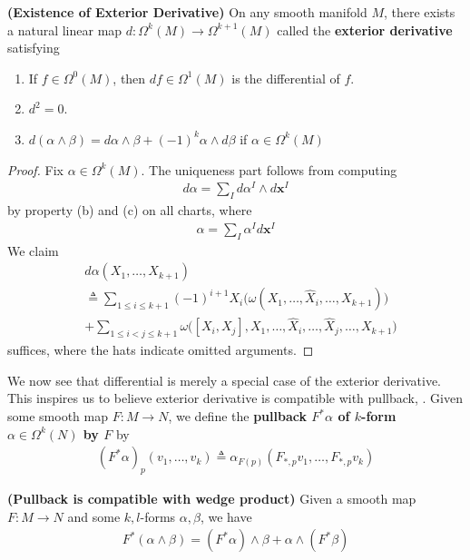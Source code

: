 \documentclass{report}
\begin{document}
\begin{theorem}
\label{Existence of Exterior Derivative}
\textbf{(Existence of Exterior Derivative)} On any smooth manifold $M$, there exists a natural linear map  $d:\Omega^k(M)\rightarrow \Omega^{k+1}(M)$ called the \textbf{exterior derivative} satisfying 
\begin{enumerate}[label=(\alph*)]
  \item If $f \in \Omega^0(M)$, then $df\in \Omega^1(M)$ is the differential of $f$. 
  \item $d^2=0$.
  \item  $d (\alpha \wedge  \beta  )=d\alpha \wedge  \beta +(-1)^k \alpha \wedge  d\beta   $ if $ \alpha  \in \Omega^k(M)$
\end{enumerate}
\end{theorem}
\begin{proof}
  Fix $\alpha  \in \Omega^k(M)$. The uniqueness part follows from computing 
  \begin{align*}
  d\alpha =\sum_I d\alpha^I \wedge  d\textbf{x}^I 
  \end{align*}
by property (b) and (c) on all charts, where 
\begin{align*}
\alpha = \sum_I \alpha^I d\textbf{x}^I
\end{align*}
We claim 
\begin{align*}
&d\alpha (X_1,\dots ,X_{k+1})\\
&\triangleq \sum_{1\leq i\leq k+1}(-1)^{i+1}X_i \Big(\omega (X_1,\dots ,\widehat{X}_i,\dots ,X_{k+1}) \Big) \\
&+\sum_{1\leq i<j\leq k+1}\omega \Big( [X_i,X_j],X_1 ,\dots ,\widehat{X}_i,\dots ,\widehat{X}_j,\dots ,X_{k+1} \Big)
\end{align*}
suffices, where the hats indicate omitted arguments.  
\end{proof}
\begin{mdframed}
We now see that differential is merely a special case of the exterior derivative. This inspires us to believe exterior derivative is compatible with pullback, . Given some smooth map $F:M\rightarrow N$, we define the \textbf{pullback $F^*\alpha $ of $k$-form  $\alpha \in \Omega^k(N)$ by $F$} by 
\begin{align*}
  (F^* \alpha )_p(v_1,\dots ,v_k)\triangleq \alpha_{F(p)}(F_{*,p}v_1,\dots ,F_{*,p}v_k)
\end{align*}
\end{mdframed}
\begin{theorem}
\label{Picw}
\textbf{(Pullback is compatible with wedge product)} Given a smooth map $F:M\rightarrow N$ and some $k,l$-forms  $\alpha ,\beta $, we have 
\begin{align*}
F^* (\alpha \wedge  \beta  )=(F^* \alpha) \wedge  \beta + \alpha \wedge  (F^* \beta ) 
\end{align*}
\end{theorem}
\end{document}
